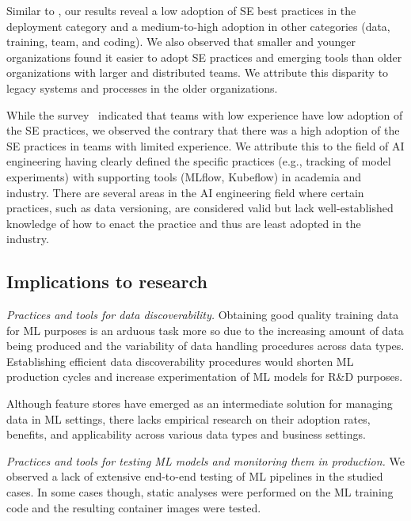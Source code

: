 Similar to \cite{Serban2020Practices}, our results reveal a low adoption of SE best practices in the deployment category and a medium-to-high adoption in other categories (data, training, team, and coding). We also observed that smaller and younger organizations found it easier to adopt SE practices and emerging tools than older organizations with larger and distributed teams. We attribute this disparity to legacy systems and processes in the older organizations.

While the survey~\cite{Serban2020Practices} indicated that teams with low experience have low adoption of the SE practices, we observed the contrary that there was a high adoption of the SE practices in teams with limited experience. We attribute this to the field of AI engineering having clearly defined the specific practices (e.g., tracking of model experiments) with supporting tools (MLflow, Kubeflow) in academia and industry. There are several areas in the AI engineering field where certain practices, such as data versioning, are considered valid but lack well-established knowledge of how to enact the practice and thus are least adopted in the industry.


\subsection{Implications to research}
\textit{Practices and tools for data discoverability.} Obtaining good quality training data for ML purposes is an arduous task more so due to the increasing amount of data being produced and the variability of data handling procedures across data types. Establishing efficient data discoverability procedures would shorten ML production cycles and increase experimentation of ML models for R\&D purposes.

Although feature stores have emerged as an intermediate solution for managing data in ML settings, there lacks empirical research on their adoption rates, benefits, and applicability across various data types and business settings.%

\textit{Practices and tools for testing ML models and monitoring them in production.} We observed a lack of extensive end-to-end testing of ML pipelines in the studied cases. In some cases though, static analyses were performed on the ML training code and the resulting container images were tested. 

